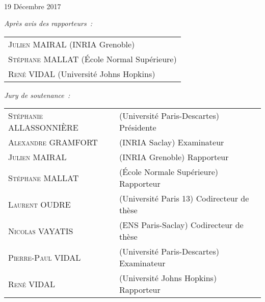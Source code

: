 \documentclass[../thesis]{subfiles}
\begin{document}
{{\begin{center}
{\Large \TITLE{}\\[4em]}
\end{center}


\vspace{10mm}

 19 Décembre 2017

\vspace{5mm}

\noindent
\textit{\small Après avis des rapporteurs~: }
\begin{tabular}{l}
\textsc{Julien MAIRAL} (INRIA Grenoble)\\
\textsc{Stéphane MALLAT} (École Normal Supérieure)\\
\textsc{René VIDAL} (Université Johns Hopkins)\\
\end{tabular}

\vspace{8mm}

\noindent
\textit{\small Jury de soutenance~: }
\begin{tabular}{ll}
\textsc{Stéphanie ALLASSONNIÈRE}&(Université Paris-Descartes) {\small Présidente}\vspace{1mm}\\
\textsc{Alexandre GRAMFORT}&(INRIA Saclay) {\small Examinateur}\vspace{1mm}\\
\textsc{Julien MAIRAL}&(INRIA Grenoble) {\small Rapporteur}\vspace{1mm}\\
\textsc{Stéphane MALLAT}&(École Normale Supérieure) {\small Rapporteur}\vspace{1mm}\\
\textsc{Laurent OUDRE}&(Université Paris 13) {\small Codirecteur de thèse}\vspace{1mm}\\
\textsc{Nicolas VAYATIS}&(ENS Paris-Saclay) {\small Codirecteur de thèse}\vspace{1mm}\\
\textsc{Pierre-Paul VIDAL}&(Université Paris-Descartes) {\small Examinateur}\vspace{1mm}\\
\textsc{René VIDAL}&(Université Johns Hopkins) {\small Rapporteur}\vspace{1mm}\\
\end{tabular}
}}
\end{document}
